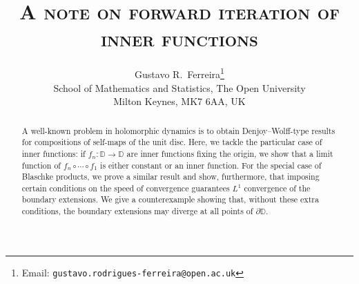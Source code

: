 \documentclass[a4paper,11pt]{article}
\theoremstyle{plain}
\theoremstyle{definition}
\theoremstyle{definition}
\def\D{\mathbb{D}}
\begin{document}
\title{\textbf{\textsc{A note on forward iteration of inner functions}}}


\author{Gustavo R.~Ferreira\thanks{Email: \texttt{gustavo.rodrigues-ferreira@open.ac.uk}}\\
  \small{School of Mathematics and Statistics, The Open University}\\
  \small{Milton Keynes, MK7 6AA, UK}
}

\maketitle

\begin{abstract}
A well-known problem in holomorphic dynamics is to obtain Denjoy--Wolff-type results for compositions of self-maps of the unit disc. Here, we tackle the particular case of inner functions: if $f_n:\D\to\D$ are inner functions fixing the origin, we show that a limit function of $f_n\circ\cdots\circ f_1$ is either constant or an inner function. For the special case of Blaschke products, we prove a similar result and show, furthermore, that imposing certain conditions on the speed of convergence guarantees $L^1$ convergence of the boundary extensions. We give a counterexample showing that, without these extra conditions, the boundary extensions may diverge at all points of $\partial\D$.
\end{abstract}


\end{document}
